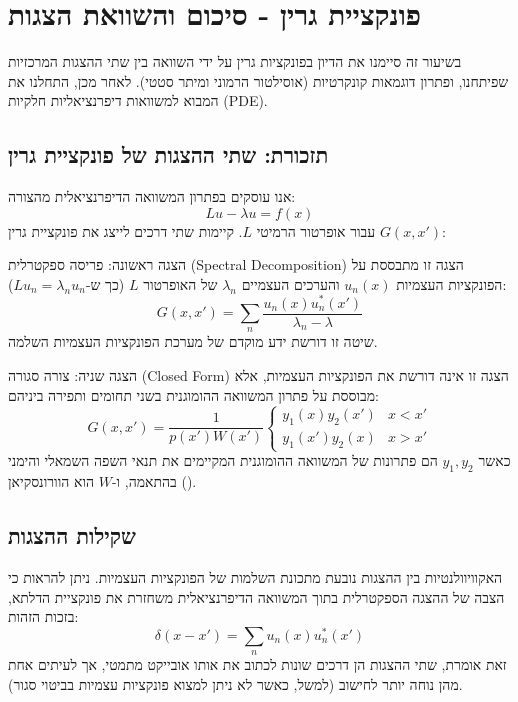 \section{פונקציית גרין - סיכום והשוואת הצגות}

בשיעור זה סיימנו את הדיון בפונקציות גרין על ידי השוואה בין שתי ההצגות המרכזיות שפיתחנו, ופתרון דוגמאות קונקרטיות (אוסילטור הרמוני ומיתר סטטי). לאחר מכן, התחלנו את המבוא למשוואות דיפרנציאליות חלקיות (PDE).

\subsection{תזכורת: שתי ההצגות של פונקציית גרין}

אנו עוסקים בפתרון המשוואה הדיפרנציאלית מהצורה:
\begin{equation}
    Lu - \lambda u = f(x)
\end{equation}
עבור אופרטור הרמיטי $L$. קיימות שתי דרכים לייצג את פונקציית גרין $G(x,x')$:

\begin{definitionbox}{הצגה ראשונה: פריסה ספקטרלית (Spectral Decomposition)}
הצגה זו מתבססת על הפונקציות העצמיות $u_n(x)$ והערכים העצמיים $\lambda_n$ של האופרטור $L$ (כך ש-$Lu_n = \lambda_n u_n$):
\begin{equation}
    G(x,x') = \sum_{n} \frac{u_n(x)u_n^*(x')}{\lambda_n - \lambda}
\end{equation}
שיטה זו דורשת ידע מוקדם של מערכת הפונקציות העצמיות השלמה.
\end{definitionbox}

\begin{definitionbox}{הצגה שניה: צורה סגורה (Closed Form)}
הצגה זו אינה דורשת את הפונקציות העצמיות, אלא מבוססת על פתרון המשוואה ההומוגנית בשני תחומים ותפירה ביניהם:
\begin{equation}
    G(x,x') = \frac{1}{p(x')W(x')} \begin{cases} 
        y_1(x)y_2(x') & x < x' \\
        y_1(x')y_2(x) & x > x'
    \end{cases}
\end{equation}
כאשר $y_1, y_2$ הם פתרונות של המשוואה ההומוגנית המקיימים את תנאי השפה השמאלי והימני בהתאמה, ו-$W$ הוא הוורונסקיאן ().
\end{definitionbox}

\subsection{שקילות ההצגות}
האקוויוולנטיות בין ההצגות נובעת מתכונת השלמות של הפונקציות העצמיות. ניתן להראות כי הצבה של ההצגה הספקטרלית בתוך המשוואה הדיפרנציאלית משחזרת את פונקציית הדלתא, בזכות הזהות:
\begin{equation}
    \delta(x-x') = \sum_{n} u_n(x)u_n^*(x')
\end{equation}
זאת אומרת, שתי ההצגות הן דרכים שונות לכתוב את אותו אובייקט מתמטי, אך לעיתים אחת מהן נוחה יותר לחישוב (למשל, כאשר לא ניתן למצוא פונקציות עצמיות בביטוי סגור).

